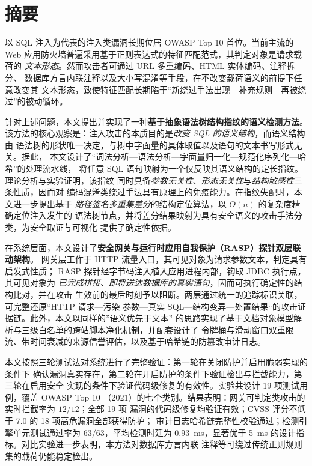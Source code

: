 {}
\section*{摘\quad 要}

以 SQL 注入为代表的注入类漏洞长期位居 OWASP Top 10 首位。当前主流的
Web 应用防火墙普遍采用基于正则表达式的特征匹配范式，其判定对象是请求载荷的
\emph{文本形态}。然而攻击者可通过 URL 多重编码、HTML 实体编码、注释拆分、
数据库方言内联注释以及大小写混淆等手段，在不改变载荷语义的前提下任意改变其
文本形态，致使特征匹配长期陷于“新绕过手法出现—补充规则—再被绕过”的被动循环。

针对上述问题，本文提出并实现了一种\textbf{基于抽象语法树结构指纹的语义检测方法}。
该方法的核心观察是：注入攻击的本质目的是\emph{改变 SQL 的语义结构}，而语义结构由
语法树的形状唯一决定，与树中字面量的具体取值以及语句的文本书写形式无关。据此，
本文设计了“词法分析—语法分析—字面量归一化—规范化序列化—哈希”的处理流水线，
将任意 SQL 语句映射为一个仅反映其语义结构的定长指纹。理论分析与实验证明，该指纹
同时具备\emph{参数无关性}、\emph{形态无关性}与\emph{结构敏感性}三条性质，因而对
编码混淆类绕过手法具有原理上的免疫能力。在指纹失配时，本文进一步提出基于
\emph{路径签名多重集差分}的结构定位算法，以 $O(n)$ 的复杂度精确定位注入发生的
语法树节点，并将差分结果映射为具有安全语义的攻击手法分类，为安全取证与可视化
提供了确定性依据。

在系统层面，本文设计了\textbf{安全网关与运行时应用自我保护（RASP）探针双层联动架构}。
网关层工作于 HTTP 流量入口，其可见对象为请求参数文本，判定具有启发式性质；
RASP 探针经字节码注入植入应用进程内部，钩取 JDBC 执行点，其可见对象为
\emph{已完成拼接、即将送达数据库的真实语句}，因而可执行确定性的结构比对，并在攻击
生效前的最后时刻予以阻断。两层通过统一的追踪标识关联，可完整还原“HTTP 请求—污染
参数—真实 SQL—结构变异—处置结果“的攻击证据链。此外，本文以同样的”语义优先于文本”
的思路实现了基于文档对象模型解析与三级白名单的跨站脚本净化机制，并配套设计了
令牌桶与滑动窗口双重限流、带时间衰减的来源信誉评估，以及基于哈希链的防篡改审计日志。

本文按照三轮测试法对系统进行了完整验证：第一轮在关闭防护并启用脆弱实现的条件下
确认漏洞真实存在，第二轮在开启防护的条件下验证检出与拦截能力，第三轮在启用安全
实现的条件下验证代码级修复的有效性。实验共设计 19 项测试用例，覆盖 OWASP Top 10
（2021）的七个类别。结果表明：网关可判定类攻击的实时拦截率为 $12/12$；全部 19 项
漏洞的代码级修复均验证有效；CVSS 评分不低于 7.0 的 18 项高危漏洞全部获得防护；
审计日志哈希链完整性校验通过；检测引擎单元测试通过率为 $63/63$，平均检测时延为
0.93~ms，显著优于 5~ms 的设计指标。对比实验进一步表明，本方法对数据库方言内联
注释等可绕过传统正则规则集的载荷仍能稳定检出。

